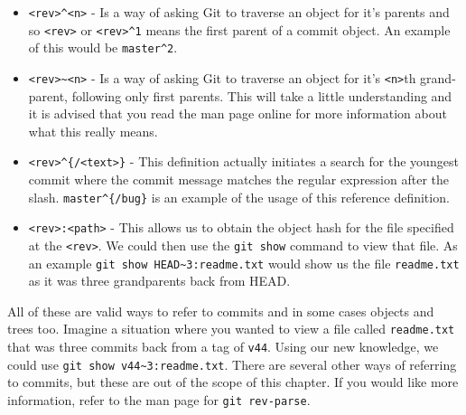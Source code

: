 \begin{itemize}
\item\texttt{<rev>\textasciicircum<n>} - Is a way of asking Git to traverse an object for it's parents and so \texttt{<rev>} or \texttt{<rev>\textasciicircum 1} means the first parent of a commit object.
An example of this would be \texttt{master\textasciicircum2}.

\item\texttt{<rev>\textasciitilde<n>} - Is a way of asking Git to traverse an object for it's \texttt{<n>}th grand-parent, following only first parents.
This will take a little understanding and it is advised that you read the man page online for more information about what this really means.

\item\texttt{<rev>\textasciicircum\{/<text>\}} - This definition actually initiates a search for the youngest commit where the commit message matches the regular expression after the slash.
\texttt{master\textasciicircum\{/bug\}} is an example of the usage of this reference definition.

\item\texttt{<rev>:<path>} - This allows us to obtain the object hash for the file specified at the \texttt{<rev>}.
We could then use the \texttt{git show} command to view that file.
As an example \texttt{git show HEAD\textasciitilde 3:readme.txt} would show us the file \texttt{readme.txt} as it was three grandparents back from HEAD.

\end{itemize}

All of these are valid ways to refer to commits and in some cases objects and trees too.
Imagine a situation where you wanted to view a file called \texttt{readme.txt} that was three commits back from a tag of \texttt{v44}.
Using our new knowledge, we could use \texttt{git show v44\textasciitilde 3:readme.txt}.
There are several other ways of referring to commits, but these are out of the scope of this chapter.
If you would like more information, refer to the man page for \texttt{git rev-parse}.
